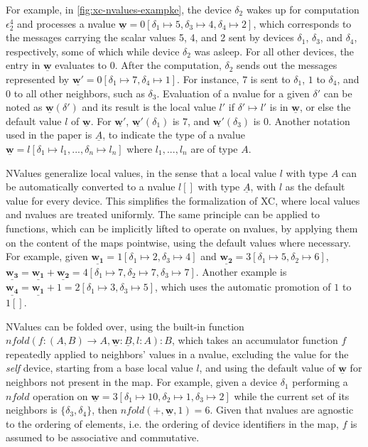 For example, in \cref{fig:xc-nvalues-exampke}, the device $\delta_2$ wakes up for computation $\epsilon_2^4$ and processes a nvalue $\underline{\mathbf{w}} = 0[\delta_1 \mapsto 5, \delta_3 \mapsto 4, \delta_4 \mapsto 2]$, which corresponds to the messages carrying the scalar values 5, 4, and 2 sent by devices $\delta_1$, $\delta_3$, and $\delta_4$, respectively, some of which while device $\delta_2$ was asleep.
%
For all other devices, the entry in $\underline{\mathbf{w}}$ evaluates to $0$.
%
After the computation, $\delta_2$ sends out the messages represented by $\underline{\mathbf{w'}} = 0[\delta_1 \mapsto 7, \delta_4 \mapsto 1]$.
%
For instance, $7$ is sent to $\delta_1$, $1$ to $\delta_4$, and $0$ to all other neighbors, such as $\delta_3$.
%
Evaluation of a nvalue for a given $\delta'$ can be noted as $\underline{\mathbf{w}}(\delta')$ and its result is the local value $l'$ if $\delta' \mapsto l'$ is in $\underline{\mathbf{w}}$, or else the default value $l$ of $\underline{\mathbf{w}}$.
%
For $\underline{\mathbf{w'}}$, $\underline{\mathbf{w'}}(\delta_1)$ is $7$, and $\underline{\mathbf{w'}}(\delta_3)$ is 0.
%
Another notation used in the paper is $\underline{A}$, to indicate the type of a nvalue $\underline{\mathbf{w}} = l[\delta_1 \mapsto l_1, ..., \delta_n \mapsto l_n]$ where $l_1, ..., l_n$ are of type $A$\cite{xc}.

NValues generalize local values, in the sense that a local value $l$ with type $A$ can be automatically converted to a nvalue $l[]$ with type $\underline{A}$, with $l$ as the default value for every device\cite{xc}.
%
This simplifies the formalization of \ac{XC}, where local values and nvalues are treated uniformly\cite{xc}.
%
The same principle can be applied to functions, which can be implicitly lifted to operate on nvalues, by applying them on the content of the maps pointwise, using the default values where necessary\cite{xc}.
%
For example, given $\underline{\mathbf{w_1}} = 1[\delta_1 \mapsto 2, \delta_3 \mapsto 4]$ and $\underline{\mathbf{w_2}} = 3[\delta_1 \mapsto 5, \delta_2 \mapsto 6]$, $\underline{\mathbf{w_3}} = \underline{\mathbf{w_1}} + \underline{\mathbf{w_2}} = 4[\delta_1 \mapsto 7, \delta_2 \mapsto 7, \delta_3 \mapsto 7]$.
%
Another example is $\underline{\mathbf{w_4}} = \underline{\mathbf{w_1}} + 1 = 2[\delta_1 \mapsto 3, \delta_3 \mapsto 5]$, which uses the automatic promotion of $1$ to $1[]$.

NValues can be folded over, using the built-in function $nfold(f : (A, B) \rightarrow A, \underline{\mathbf{w}} : \underline{B}, l : A) : B$, which takes an accumulator function $f$ repeatedly applied to neighbors' values in a nvalue, excluding the value for the \textit{self} device, starting from a base local value $l$, and using the default value of $\underline{\mathbf{w}}$ for neighbors not present in the map\cite{xc}.
%
For example, given a device $\delta_1$ performing a $nfold$ operation on $\underline{\mathbf{w}} = 3[\delta_1 \mapsto 10, \delta_2 \mapsto 1, \delta_3 \mapsto 2]$ while the current set of its neighbors is $\{\delta_3, \delta_4\}$, then $nfold(+, \underline{\mathbf{w}}, 1) = 6$.
%
Given that nvalues are agnostic to the ordering of elements, i.e. the ordering of device identifiers in the map, $f$ is assumed to be associative and commutative\cite{xc}.

